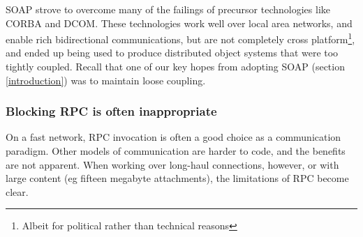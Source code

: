 
SOAP strove to overcome many of the failings of precursor technologies
like CORBA and DCOM. These technologies work well over local area
networks, and enable rich bidirectional communications, but are not
completely cross platform\footnote{Albeit for political rather than
technical reasons}, and ended up being used to produce distributed
object systems that were too tightly coupled. Recall that one of our
key hopes from adopting SOAP (section \ref{introduction}) was to
maintain loose coupling.



\subsubsection{Blocking RPC is often inappropriate}
\label{objections:soap-not-rmi:blocking}

On a fast network, RPC invocation is often a good choice as a
communication paradigm. Other models of communication are harder to
code, and the benefits are not apparent. When working over long-haul
connections, however, or with large content (eg fifteen megabyte
attachments), the limitations of RPC become clear. 

